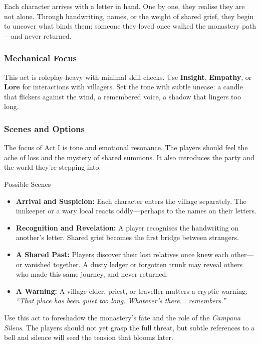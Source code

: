 Each character arrives with a letter in hand. One by one, they realise they are not alone. Through handwriting, names, or the weight of shared grief, they begin to uncover what binds them: someone they loved once walked the monastery path—and never returned.

\subsubsection{Mechanical Focus}
This act is roleplay-heavy with minimal skill checks. Use \textbf{Insight}, \textbf{Empathy}, or \textbf{Lore} for interactions with villagers. Set the tone with subtle unease: a candle that flickers against the wind, a remembered voice, a shadow that lingers too long.

\subsubsection{Scenes and Options}

The focus of Act I is tone and emotional resonance. The players should feel the ache of loss and the mystery of shared summons. It also introduces the party and the world they’re stepping into.

\begin{Example}{Possible Scenes}
\begin{itemize}
    \item \textbf{Arrival and Suspicion:} Each character enters the village separately. The innkeeper or a wary local reacts oddly—perhaps to the names on their letters.
    
    \item \textbf{Recognition and Revelation:} A player recognises the handwriting on another’s letter. Shared grief becomes the first bridge between strangers.

    \item \textbf{A Shared Past:} Players discover their lost relatives once knew each other—or vanished together. A dusty ledger or forgotten trunk may reveal others who made this same journey, and never returned.

    \item \textbf{A Warning:} A village elder, priest, or traveller mutters a cryptic warning: \emph{“That place has been quiet too long. Whatever’s there... remembers.”}
\end{itemize}
\end{Example}

Use this act to foreshadow the monastery’s fate and the role of the \emph{Campana Silens}. The players should not yet grasp the full threat, but subtle references to a bell and silence will seed the tension that blooms later.

